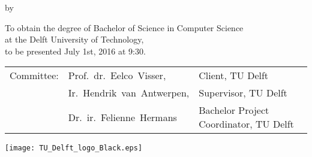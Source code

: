 \makecover

\begin{titlepage}
  \begin{center}
    {\makeatletter
    \largetitlestyle\fontsize{64}{94}\selectfont\@title
    \makeatother}

    {\makeatletter
    \ifx\@subtitle\undefined\else
        \bigskip
       {\tudsffamily\fontsize{22}{32}\selectfont\@subtitle}
    \fi
    \makeatother}

    \bigskip
    \bigskip

    by

    \bigskip
    \bigskip

    {\makeatletter
    \largetitlestyle\fontsize{26}{26}\selectfont\@author
    \makeatother}

    \bigskip
    \bigskip
    \vfill

    {\large
      To obtain the degree of Bachelor of Science in Computer
      Science\\
      at the Delft University of Technology,\\
      to be presented July 1st, 2016 at 9:30.
    }

    \bigskip
    \bigskip
    \vfill

    \begin{tabular}{lll}
      Committee: & Prof.~dr.~Eelco~Visser,    & Client, TU Delft \\
                 & Ir.~Hendrik~van~Antwerpen, & Supervisor, TU Delft \\
                 & Dr.~ir.~Felienne~Hermans   & Bachelor Project
                                                Coordinator, TU Delft
    \end{tabular}

    \vfill
    \texttt{[image: TU\_Delft\_logo\_Black.eps]}
  \end{center}
\end{titlepage}
